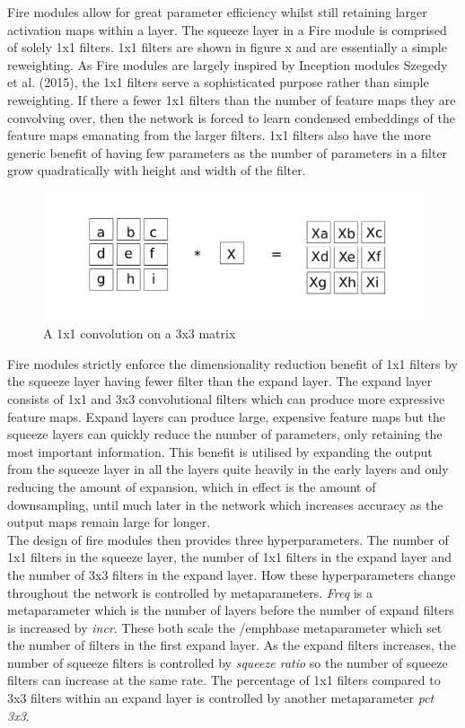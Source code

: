 \documentclass{article}
\begin{document}
Fire modules allow for great parameter efficiency whilst still retaining larger activation maps within a layer. The squeeze layer in a Fire module is comprised of solely 1x1 filters. 1x1 filters are shown in figure x and are essentially a simple reweighting. As Fire modules are largely inspired by Inception modules Szegedy et al. (2015), the 1x1 filters serve a sophisticated purpose rather than simple reweighting. If there a fewer 1x1 filters than the number of feature maps they are convolving over, then the network is forced to learn condensed embeddings of the feature maps emanating from the larger filters. 1x1 filters also have the more generic benefit of having few parameters as the number of parameters in a filter grow quadratically with height and width of the filter.\\

\begin{figure}[h]
  \includegraphics[width=\linewidth]{convonebyone.pdf}
  \caption{A 1x1 convolution on a 3x3 matrix}
  \label{fig:conv1x1}
\end{figure}

Fire modules strictly enforce the dimensionality reduction benefit of 1x1 filters by the squeeze layer having fewer filter than the expand layer. The expand layer consists of 1x1 and 3x3 convolutional filters which can produce more expressive feature maps. Expand layers can produce large, expensive feature maps but the squeeze layers can quickly reduce the number of parameters, only retaining the most important information. This benefit is utilised by expanding the output from the squeeze layer in all the layers quite heavily in the early layers and only reducing the amount of expansion, which in effect is the amount of downsampling, until much later in the network which increases accuracy as the output maps remain large for longer.\\

The design of fire modules then provides three hyperparameters. The number of 1x1 filters in the squeeze layer, the number of 1x1 filters in the expand layer and the number of 3x3 filters in the expand layer. How these hyperparameters change throughout the network is controlled by metaparameters. \emph{Freq} is a metaparameter which is the number of layers before the number of expand filters is increased by \emph{incr}. These both scale the /emph{base} metaparameter which set the number of filters in the first expand layer. As the expand filters increases, the number of squeeze filters is controlled by \emph{squeeze ratio} so the number of squeeze filters can increase at the same rate. The percentage of 1x1 filters compared to 3x3 filters within an expand layer is controlled by another metaparameter \emph{pct 3x3}. \\
\end{document}
